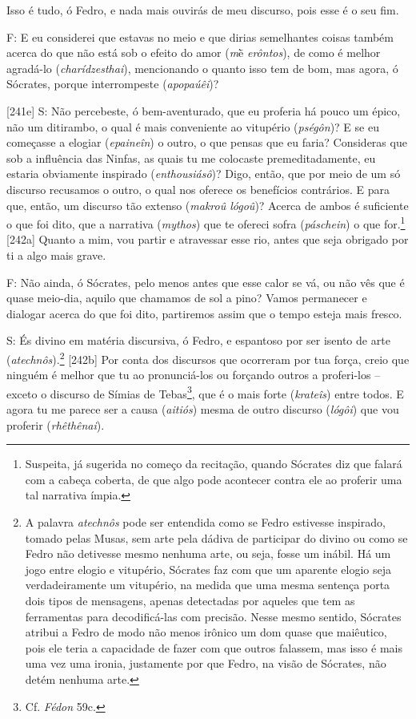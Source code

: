 Isso é tudo, ó Fedro, e nada mais ouvirás de meu discurso, pois esse é o
seu fim.

F: E eu considerei que estavas no meio e que dirias semelhantes coisas
também acerca do que não está sob o efeito do amor (\emph{m}ḕ
\emph{erôntos}), de como é melhor agradá-lo (\emph{charídzesthai}),
mencionando o quanto isso tem de bom, mas agora, ó Sócrates, porque
interrompeste (\emph{apopaúêi})?

{[}241e{]} S: Não percebeste, ó bem-aventurado, que eu proferia há pouco
um épico, não um ditirambo, o qual é mais conveniente ao vitupério
(\emph{pségôn})? E se eu começasse a elogiar (\emph{epaineîn}) o outro,
o que pensas que eu faria? Consideras que sob a influência das Ninfas,
as quais tu me colocaste premeditadamente, eu estaria obviamente
inspirado (\emph{enthousiásô})? Digo, então, que por meio de um só
discurso recusamos o outro, o qual nos oferece os benefícios contrários.
E para que, então, um discurso tão extenso (\emph{makroû lógoû})? Acerca
de ambos é suficiente o que foi dito, que a narrativa (\emph{mythos})
que te ofereci sofra (\emph{páschein}) o que for.\footnote{Suspeita, já
  sugerida no começo da recitação, quando Sócrates diz que falará com a
  cabeça coberta, de que algo pode acontecer contra ele ao proferir uma
  tal narrativa ímpia.} {[}242a{]} Quanto a mim, vou partir e atravessar
esse rio, antes que seja obrigado por ti a algo mais grave.

F: Não ainda, ó Sócrates, pelo menos antes que esse calor se vá, ou não
vês que é quase meio-dia, aquilo que chamamos de sol a pino? Vamos
permanecer e dialogar acerca do que foi dito, partiremos assim que o
tempo esteja mais fresco.

S: És divino em matéria discursiva, ó Fedro, e espantoso por ser isento
de arte (\emph{atechnôs}).\footnote{A palavra \emph{atechnôs} pode ser
  entendida como se Fedro estivesse inspirado, tomado pelas Musas, sem
  arte pela dádiva de participar do divino ou como se Fedro não
  detivesse mesmo nenhuma arte, ou seja, fosse um inábil. Há um jogo
  entre elogio e vitupério, Sócrates faz com que um aparente elogio seja
  verdadeiramente um vitupério, na medida que uma mesma sentença porta
  dois tipos de mensagens, apenas detectadas por aqueles que tem as
  ferramentas para decodificá-las com precisão. Nesse mesmo sentido,
  Sócrates atribui a Fedro de modo não menos irônico um dom quase que
  maiêutico, pois ele teria a capacidade de fazer com que outros
  falassem, mas isso é mais uma vez uma ironia, justamente por que
  Fedro, na visão de Sócrates, não detém nenhuma arte.} {[}242b{]} Por
conta dos discursos que ocorreram por tua força, creio que ninguém é
melhor que tu ao pronunciá-los ou forçando outros a proferi-los --
exceto o discurso de Símias de Tebas\footnote{Cf. \emph{Fédon} 59c.},
que é o mais forte (\emph{krateîs}) entre todos. E agora tu me parece
ser a causa (\emph{aitiós}) mesma de outro discurso (\emph{lógôi}) que
vou proferir (\emph{rhêthênai}).

